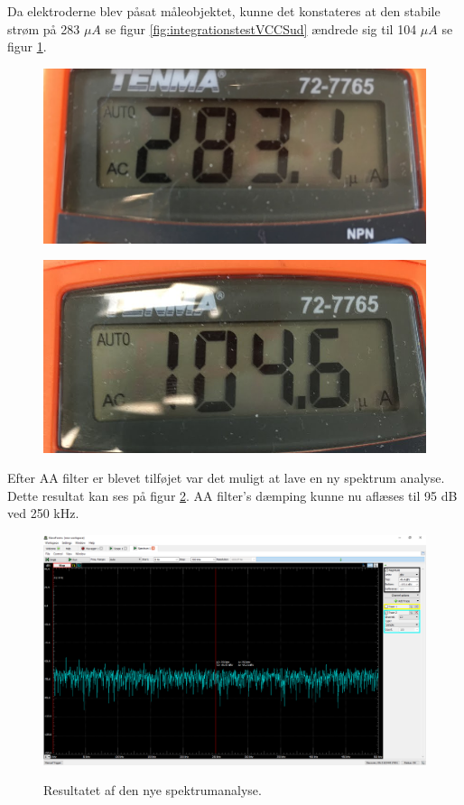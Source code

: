 Da elektroderne blev påsat måleobjektet, kunne det konstateres at den stabile strøm på 283 $\mu A$ se figur \ref{fig:integrationstestVCCSud} ændrede sig til 104 $\mu A$ se figur \ref{fig:integrationstestINA2udstrom}.

\begin{figure}[H]
\centering
\begin{minipage}{.5\textwidth}
  \centering
  \includegraphics[width=.6\linewidth]{Figure/integrationstestVCCSud}
  \label{fig:integrationstestVCCSud}
\end{minipage}%
\begin{minipage}{.5\textwidth}
  \centering
  \includegraphics[width=.6\linewidth]{Figure/integrationstestINA2udstrom}
  \label{fig:integrationstestINA2udstrom}
\end{minipage}
\end{figure}

Efter AA filter er blevet tilføjet var det muligt at lave en ny spektrum analyse. Dette resultat kan ses på figur \ref{fig:integrationstestAAspectrum}. AA filter's dæmping kunne nu aflæses til 95 dB ved 250 kHz.

\begin{figure}[H] 
\centering
{\includegraphics[width=\linewidth]
{Figure/integrationstestAAspectrum}}
\caption{Resultatet af den nye spektrumanalyse.}
\label{fig:integrationstestAAspectrum}
\end{figure}


